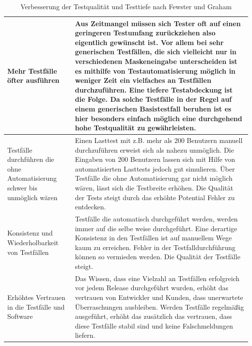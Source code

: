 \begin{table}
\begin{tabular}{p{}|p{}}
\\
\hline 
Mehr Testfälle öfter ausführen
& Aus Zeitmangel müssen sich Tester oft auf einen geringeren Testumfang zurückziehen also eigentlich gewünscht ist. Vor allem bei sehr generischen Testfällen, die sich vielleicht nur in verschiedenen Maskeneingabe unterscheiden ist es mithilfe von Testautomatisierung möglich in weniger Zeit ein vielfaches an Testfällen durchzuführen.
Eine tiefere Testabdeckung ist die Folge. Da solche Testfälle in der Regel auf einem generischen Basistestfall beruhen ist es hier besonders einfach möglich eine durchgehend hohe Testqualität zu gewährleisten. \\ 
\hline 
Testfälle durchführen die ohne Automatisierung schwer bis unmöglich wären & 
Einen Lasttest mit z.B. mehr als 200 Benutzern manuell durchzuführen erweist sich als nahezu unmöglich. Die Eingaben von 200 Benutzern lassen sich mit Hilfe von automatisierten Lasttests jedoch gut simulieren. Über Testfälle die ohne Automatisierung gar nicht möglich wären, lässt sich die Testbreite erhöhen. Die Qualität der Tests steigt durch das erhöhte Potential Fehler zu entdecken. \\ 
\hline 
Konsistenz und Wiederholbarkeit von Testfällen & Testfälle die automatisch durchgeführt werden, werden immer auf die selbe weise durchgeführt. Eine derartige Konsistenz in den Testfällen ist auf manuellem Wege kaum zu erreichen. Fehler in der Testfalldurchführung können so vermieden werden. Die Qualität der Testfälle steigt. \\ 
\hline 
Erhöhtes Vertrauen in die Testfälle und Software & Das Wissen, dass eine Vielzahl an Testfällen erfolgreich vor jedem Release durchgeführt wurden, erhöht das vertrauen von Entwickler und Kunden, dass unerwartete Überraschungen ausbleiben.
Werden Testfälle regelmäßig ausgeführt, erhöht das zusätzlich das vertrauen, dass diese Testfälle stabil sind und keine Falschmeldungen liefern. \\ 


\end{tabular} 
\caption{Verbesserung der Testqualität und Testtiefe nach Fewster und Graham \cite[vgl. S. 9 ff.]{fewster_software_1999}}
\label{tbl:qualitaet_testautomatisierung}
\end{table}

